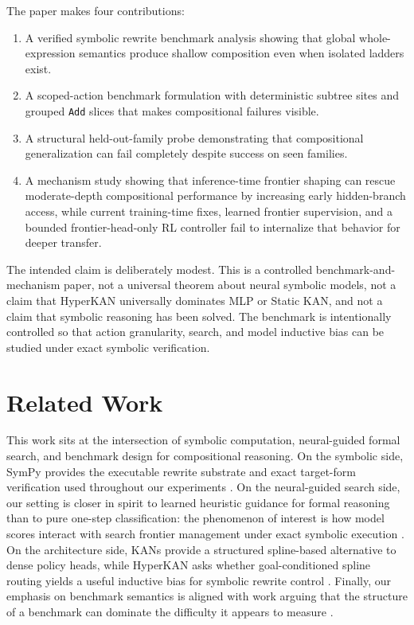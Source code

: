 \documentclass[11pt]{article}
\newcommand{\sympy}{SymPy}
\newcommand{\kan}{KAN}
\newcommand{\hyperkan}{HyperKAN}
\newcommand{\staticKAN}{Static KAN}
\newcommand{\mlp}{MLP}
\begin{document}
The paper makes four contributions:
\begin{enumerate}
  \item A verified symbolic rewrite benchmark analysis showing that global whole-expression semantics produce shallow composition even when isolated ladders exist.
  \item A scoped-action benchmark formulation with deterministic subtree sites and grouped \texttt{Add} slices that makes compositional failures visible.
  \item A structural held-out-family probe demonstrating that compositional generalization can fail completely despite success on seen families.
  \item A mechanism study showing that inference-time frontier shaping can rescue moderate-depth compositional performance by increasing early hidden-branch access, while current training-time fixes, learned frontier supervision, and a bounded frontier-head-only RL controller fail to internalize that behavior for deeper transfer.
\end{enumerate}

The intended claim is deliberately modest. This is a controlled benchmark-and-mechanism paper, not a universal theorem about neural symbolic models, not a claim that \hyperkan{} universally dominates \mlp{} or \staticKAN{}, and not a claim that symbolic reasoning has been solved. The benchmark is intentionally controlled so that action granularity, search, and model inductive bias can be studied under exact symbolic verification.

\section{Related Work}

This work sits at the intersection of symbolic computation, neural-guided formal search, and benchmark design for compositional reasoning. On the symbolic side, \sympy{} provides the executable rewrite substrate and exact target-form verification used throughout our experiments \cite{meurer2017sympy}. On the neural-guided search side, our setting is closer in spirit to learned heuristic guidance for formal reasoning than to pure one-step classification: the phenomenon of interest is how model scores interact with search frontier management under exact symbolic execution \cite{loos2017deep,polu2020gen}. On the architecture side, \kan{}s provide a structured spline-based alternative to dense policy heads, while \hyperkan{} asks whether goal-conditioned spline routing yields a useful inductive bias for symbolic rewrite control \cite{liu2024kan}. Finally, our emphasis on benchmark semantics is aligned with work arguing that the structure of a benchmark can dominate the difficulty it appears to measure \cite{chollet2019measure,trinh2024alphageometry}.
\end{document}
